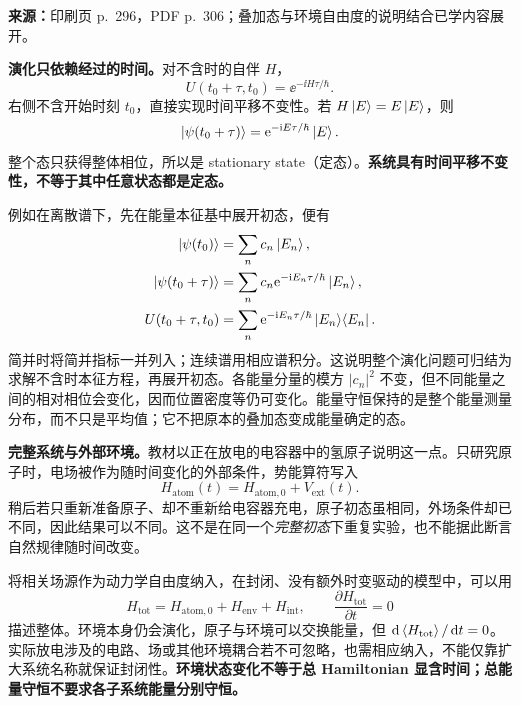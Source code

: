\textbf{来源：}印刷页 p.~296，PDF p.~306；叠加态与环境自由度的说明结合已学内容展开。

\textbf{演化只依赖经过的时间。}对不含时的自伴 $H$，
\begin{equation}
  \boxed{U(t_0+\tau,t_0)=\ee^{-\ii H\tau/\hbar}}.
\end{equation}
右侧不含开始时刻 $t_0$，直接实现时间平移不变性。若 $H\left|E\right\rangle=E\left|E\right\rangle$，则
\begin{equation}
  \left|\psi(t_0+\tau)\right\rangle
   =\mathrm{e}^{-\mathrm{i} E\tau/\hbar}\left|E\right\rangle.
\end{equation}
整个态只获得整体相位，所以是 stationary state（定态）。\textbf{系统具有时间平移不变性，不等于其中任意状态都是定态。}

例如在离散谱下，先在能量本征基中展开初态，便有
\begin{align}
  \left|\psi(t_0)\right\rangle&=\sum_n c_n\left|E_n\right\rangle,\\
  \left|\psi(t_0+\tau)\right\rangle
    &=\sum_n c_n\mathrm{e}^{-\mathrm{i} E_n\tau/\hbar}\left|E_n\right\rangle,\\
  U(t_0+\tau,t_0)
    &=\sum_n\mathrm{e}^{-\mathrm{i} E_n\tau/\hbar}\left|E_n\right\rangle\!\left\langle E_n\right|.
\end{align}
简并时将简并指标一并列入；连续谱用相应谱积分。这说明整个演化问题可归结为求解不含时本征方程，再展开初态。各能量分量的模方 $|c_n|^2$ 不变，但不同能量之间的相对相位会变化，因而位置密度等仍可变化。能量守恒保持的是整个能量测量分布，而不只是平均值；它不把原本的叠加态变成能量确定的态。

\textbf{完整系统与外部环境。}教材以正在放电的电容器中的氢原子说明这一点。只研究原子时，电场被作为随时间变化的外部条件，势能算符写入
\begin{equation}
  H_{\mathrm{atom}}(t)=H_{\mathrm{atom},0}+V_{\mathrm{ext}}(t).
\end{equation}
稍后若只重新准备原子、却不重新给电容器充电，原子初态虽相同，外场条件却已不同，因此结果可以不同。这不是在同一个\emph{完整初态}下重复实验，也不能据此断言自然规律随时间改变。

将相关场源作为动力学自由度纳入，在封闭、没有额外时变驱动的模型中，可以用
\begin{equation}
  H_{\mathrm{tot}}
    =H_{\mathrm{atom},0}+H_{\mathrm{env}}+H_{\mathrm{int}},
  \qquad \frac{\partial H_{\mathrm{tot}}}{\partial t}=0
\end{equation}
描述整体。环境本身仍会演化，原子与环境可以交换能量，但 $\mathop{}\!\mathrm{d}\left\langle H_{\mathrm{tot}} \right\rangle/\mathop{}\!\mathrm{d} t=0$。实际放电涉及的电路、场或其他环境耦合若不可忽略，也需相应纳入，不能仅靠扩大系统名称就保证封闭性。\textbf{环境状态变化不等于总 Hamiltonian 显含时间；总能量守恒不要求各子系统能量分别守恒。}

